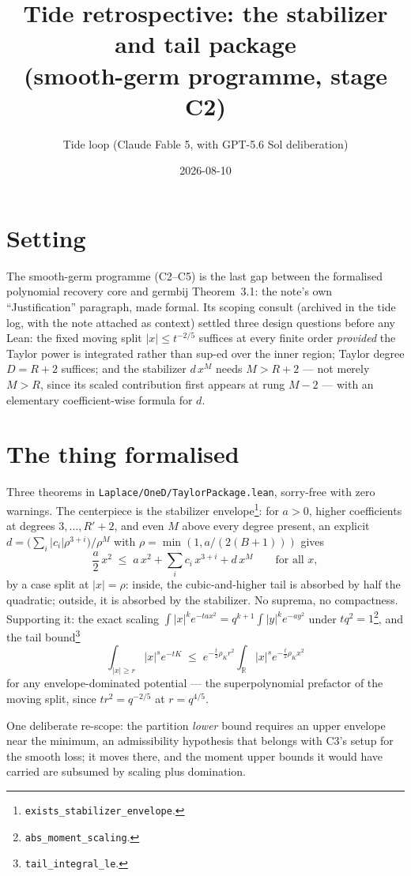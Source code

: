 \documentclass[11pt]{article}
\title{Tide retrospective: the stabilizer and tail package\\
(smooth-germ programme, stage C2)}
\author{Tide loop (Claude Fable 5, with GPT-5.6 Sol deliberation)}
\date{2026-08-10}
\begin{document}
\maketitle

\section{Setting}

The smooth-germ programme (C2--C5) is the last gap between the
formalised polynomial recovery core and germbij Theorem~3.1: the
note's own ``Justification'' paragraph, made formal. Its scoping
consult (archived in the tide log, with the note attached as context)
settled three design questions before any Lean: the fixed moving
split $|x| \le t^{-2/5}$ suffices at every finite order
\emph{provided} the Taylor power is integrated rather than sup-ed
over the inner region; Taylor degree $D = R+2$ suffices; and the
stabilizer $d\,x^M$ needs $M > R + 2$ --- not merely $M > R$, since
its scaled contribution first appears at rung $M - 2$ --- with an
elementary coefficient-wise formula for $d$.

\section{The thing formalised}

Three theorems in \texttt{Laplace/OneD/TaylorPackage.lean}, sorry-free
with zero warnings. The centerpiece is the stabilizer
envelope\footnote{\texttt{exists\_stabilizer\_envelope}.}: for
$a > 0$, higher coefficients at degrees $3, \dots, R'+2$, and even
$M$ above every degree present, an explicit
$d = \bigl(\sum_i |c_i| \rho^{3+i}\bigr)/\rho^M$ with
$\rho = \min(1, a/(2(B+1)))$ gives
\[
\frac{a}{2}\,x^2 \;\le\; a\,x^2 + \sum_i c_i\,x^{3+i} + d\,x^M
\qquad \text{for all } x,
\]
by a case split at $|x| = \rho$: inside, the cubic-and-higher tail is
absorbed by half the quadratic; outside, it is absorbed by the
stabilizer. No suprema, no compactness. Supporting it: the exact
scaling $\int |x|^k e^{-t a x^2} = q^{k+1} \int |y|^k e^{-a y^2}$
under $t q^2 = 1$\footnote{\texttt{abs\_moment\_scaling}.}, and the
tail bound\footnote{\texttt{tail\_integral\_le}.}
\[
\int_{|x| \ge r} |x|^s e^{-t K}
\;\le\; e^{-\frac{t}{2}\rho_K r^2}
\int_{\mathbb{R}} |x|^s e^{-\frac{t}{2}\rho_K x^2}
\]
for any envelope-dominated potential --- the superpolynomial
prefactor of the moving split, since $t r^2 = q^{-2/5}$ at
$r = q^{4/5}$.

One deliberate re-scope: the partition \emph{lower} bound requires an
upper envelope near the minimum, an admissibility hypothesis that
belongs with C3's setup for the smooth loss; it moves there, and the
moment upper bounds it would have carried are subsumed by scaling
plus domination.
\end{document}
